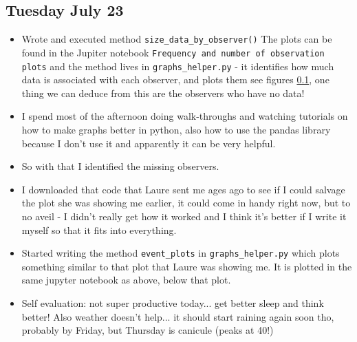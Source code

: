 \documentclass[12pt]{article}
\begin{document}
\subsection{Tuesday July 23}
\begin{itemize}
    \item Wrote and executed method \texttt{size\_data\_by\_observer()} The plots can be found in the Jupiter notebook \texttt{Frequency and number of observation plots} and the method lives in \texttt{graphs\_helper.py} - it identifies how much data is associated with each observer, and plots them see figures \ref{}, one thing we can deduce from this are the observers who have no data!
    \item I spend most of the afternoon doing walk-throughs and watching tutorials on how to make graphs better in python, also how to use the pandas library because I don't use it and apparently it can be very helpful.
    \item So with that I identified the missing observers.
    \item I downloaded that code that Laure sent me ages ago to see if I could salvage the plot she was showing me earlier, it could come in handy right now, but to no aveil - I didn't really get how it worked and I think it's better if I write it myself so that it fits into everything.
    \item Started writing the method \texttt{event\_plots} in \texttt{graphs\_helper.py} which plots something similar to that plot that Laure was showing me. It is plotted in the same jupyter notebook as above, below that plot.
    \item Self evaluation: not super productive today... get better sleep and think better! Also weather doesn't help... it should start raining again soon tho, probably by Friday, but Thursday is canicule (peaks at 40!)
\end{itemize}
\end{document}
